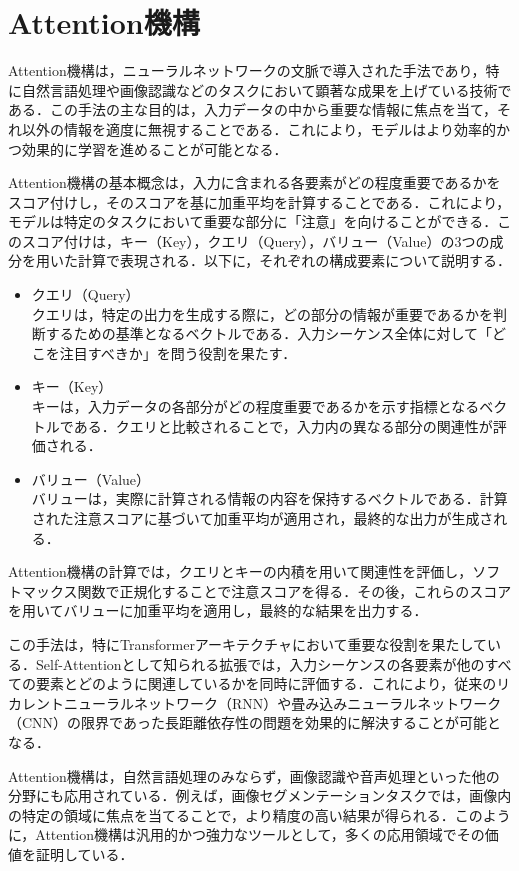 
\section{Attention機構}
Attention機構は，ニューラルネットワークの文脈で導入された手法であり，特に自然言語処理や画像認識などのタスクにおいて顕著な成果を上げている技術である．この手法の主な目的は，入力データの中から重要な情報に焦点を当て，それ以外の情報を適度に無視することである．これにより，モデルはより効率的かつ効果的に学習を進めることが可能となる．

Attention機構の基本概念は，入力に含まれる各要素がどの程度重要であるかをスコア付けし，そのスコアを基に加重平均を計算することである．これにより，モデルは特定のタスクにおいて重要な部分に「注意」を向けることができる．このスコア付けは，キー（Key），クエリ（Query），バリュー（Value）の3つの成分を用いた計算で表現される．以下に，それぞれの構成要素について説明する．

\begin{itemize}
  \item クエリ（Query）\\
  クエリは，特定の出力を生成する際に，どの部分の情報が重要であるかを判断するための基準となるベクトルである．入力シーケンス全体に対して「どこを注目すべきか」を問う役割を果たす．
  \item キー（Key）\\
  キーは，入力データの各部分がどの程度重要であるかを示す指標となるベクトルである．クエリと比較されることで，入力内の異なる部分の関連性が評価される．
  \item バリュー（Value）\\
  バリューは，実際に計算される情報の内容を保持するベクトルである．計算された注意スコアに基づいて加重平均が適用され，最終的な出力が生成される．
\end{itemize}

Attention機構の計算では，クエリとキーの内積を用いて関連性を評価し，ソフトマックス関数で正規化することで注意スコアを得る．その後，これらのスコアを用いてバリューに加重平均を適用し，最終的な結果を出力する．

この手法は，特にTransformerアーキテクチャにおいて重要な役割を果たしている．Self-Attentionとして知られる拡張では，入力シーケンスの各要素が他のすべての要素とどのように関連しているかを同時に評価する．これにより，従来のリカレントニューラルネットワーク（RNN）や畳み込みニューラルネットワーク（CNN）の限界であった長距離依存性の問題を効果的に解決することが可能となる．

Attention機構は，自然言語処理のみならず，画像認識や音声処理といった他の分野にも応用されている．例えば，画像セグメンテーションタスクでは，画像内の特定の領域に焦点を当てることで，より精度の高い結果が得られる．このように，Attention機構は汎用的かつ強力なツールとして，多くの応用領域でその価値を証明している．

\newpage
